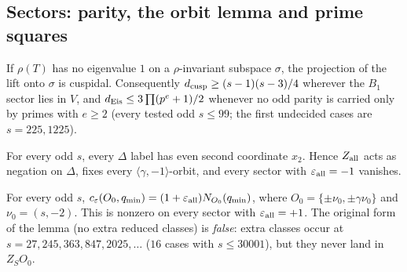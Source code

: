 \subsection{Sectors: parity, the orbit lemma and prime squares}\label{sec:rev5sec}
\begin{proposition}\label{prop:oddcusp5}
If $\rho(T)$ has no eigenvalue $1$ on a $\rho$-invariant subspace $\sigma$, the projection of the lift onto $\sigma$ is cuspidal. Consequently $d_{\rm cusp}\ge(s-1)(s-3)/4$ wherever the $B_1$ sector lies in $V$, and
$d_{\rm Eis}\le3\prod(p^e+1)/2$ whenever no odd parity is carried only by primes with $e\ge2$ (every tested odd $s\le99$; the first undecided cases are $s=225,1225$).
\end{proposition}
\begin{proposition}\label{prop:parity5}
For every odd $s$, every $\Delta$ label has even second coordinate $x_2$. Hence $Z_{\rm all}$ acts as negation on $\Delta$, fixes every $\langle\gamma,-1\rangle$-orbit, and every sector with $\varepsilon_{\rm all}=-1$ vanishes.
\end{proposition}
\begin{proposition}\label{prop:orbit5}
For every odd $s$, $c_\varepsilon(O_0,q_{\min})=(1+\varepsilon_{\rm all})N_{O_0}(q_{\min})$, where $O_0=\{\pm\nu_0,\pm\gamma\nu_0\}$ and $\nu_0=(s,-2)$. This is nonzero on every sector with $\varepsilon_{\rm all}=+1$. The original form of the lemma (no extra
reduced classes) is \emph{false}: extra classes occur at $s=27,245,363,847,2025,\dots$ ($16$ cases with $s\le30001$), but they never land in $Z_SO_0$.
\end{proposition}

